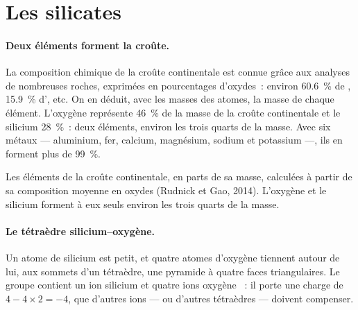 \section{Les silicates}

\paragraph{Deux éléments forment la croûte.} La composition chimique de la
croûte continentale est connue grâce aux analyses de nombreuses roches,
exprimées en pourcentages d'oxydes~: environ \qty{60.6}{\percent} de
, \qty{15.9}{\percent} d', etc. On en déduit, avec les
masses des atomes, la masse de chaque élément. L'oxygène représente
\qty{46}{\percent} de la masse de la croûte continentale et le silicium
\qty{28}{\percent}~: deux éléments, environ les trois quarts de la masse.
Avec six métaux --- aluminium, fer, calcium, magnésium, sodium et
potassium ---, ils en forment plus de \qty{99}{\percent}.

\begin{omfigure}

{\small Les éléments de la croûte continentale, en parts de sa masse,
calculées à partir de sa composition moyenne en oxydes (Rudnick et Gao,
2014). L'oxygène et le silicium forment à eux seuls environ les trois quarts
de la masse.}
\end{omfigure}

\paragraph{Le tétraèdre silicium--oxygène.} Un atome de silicium est petit,
et quatre atomes d'oxygène tiennent autour de lui, aux sommets d'un
tétraèdre, une pyramide à quatre faces triangulaires. Le groupe contient un
ion silicium  et quatre ions oxygène ~: il porte une
charge de $4 - 4 \times 2 = -4$, que d'autres ions --- ou d'autres
tétraèdres --- doivent compenser.

